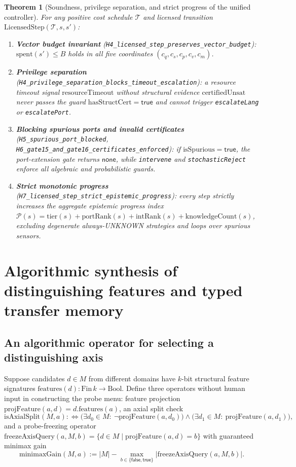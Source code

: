 \documentclass[11pt,a4paper]{article}
\theoremstyle{cleanthm}
\newtheorem{theorem}{Theorem}[section]
\DeclareRobustCommand{\id}[1]{\allowbreak\nolinkurl{#1}\allowbreak}
\begin{document}
\begin{theorem}[Soundness, privilege separation, and strict progress of the unified controller]
\label{thm:h4_h7_controller}
For any positive cost schedule $\mathcal T$ and licensed transition $\mathrm{LicensedStep}(\mathcal T,s,s')$:
\begin{enumerate}
\item \textbf{Vector budget invariant} (\id{H4_licensed_step_preserves_vector_budget}): $\mathrm{spent}(s')\le B$ holds in all five coordinates $(c_q,c_s,c_p,c_v,c_m)$.
\item \textbf{Privilege separation} (\id{H4_privilege_separation_blocks_timeout_escalation}): a resource timeout signal $\mathrm{resourceTimeout}$ without structural evidence $\mathrm{certifiedUnsat}$ never passes the guard $\mathrm{hasStructCert}=\mathsf{true}$ and cannot trigger \id{escalateLang} or \id{escalatePort}.
\item \textbf{Blocking spurious ports and invalid certificates} (\id{H5_spurious_port_blocked}, \id{H6_gate15_and_gate16_certificates_enforced}): if $\mathrm{isSpurious}=\mathsf{true}$, the port-extension gate returns $\mathsf{none}$, while \id{intervene} and \id{stochasticReject} enforce all algebraic and probabilistic guards.
\item \textbf{Strict monotonic progress} (\id{H7_licensed_step_strict_epistemic_progress}): every step strictly increases the aggregate epistemic progress index $\mathcal P(s)=\mathrm{tier}(s)+\mathrm{portRank}(s)+\mathrm{intRank}(s)+\mathrm{knowledgeCount}(s)$, excluding degenerate always-UNKNOWN strategies and loops over spurious sensors.
\end{enumerate}
\end{theorem}

\section{Algorithmic synthesis of distinguishing features and typed transfer memory}

\subsection{An algorithmic operator for selecting a distinguishing axis}
Suppose candidates $d\in M$ from different domains have $k$-bit structural feature signatures $\mathrm{features}(d):\mathrm{Fin}\,k\to\mathrm{Bool}$. Define three operators without human input in constructing the probe menu: feature projection $\mathrm{projFeature}(a,d)=d.\mathrm{features}(a)$, an axial split check
\begin{equation}
  \mathrm{isAxialSplit}(M,a):\iff
  \bigl(\exists d_0\in M:\ \neg\mathrm{projFeature}(a,d_0)\bigr)
  \land\bigl(\exists d_1\in M:\ \mathrm{projFeature}(a,d_1)\bigr),
\end{equation}
and a probe-freezing operator $\mathrm{freezeAxisQuery}(a,M,b)=\{d\in M\mid\mathrm{projFeature}(a,d)=b\}$ with guaranteed minimax gain
\begin{equation}
  \mathrm{minimaxGain}(M,a):=|M|-\max_{b\in\{\mathsf{false},\mathsf{true}\}}\bigl|\mathrm{freezeAxisQuery}(a,M,b)\bigr|.
\end{equation}
\end{document}
